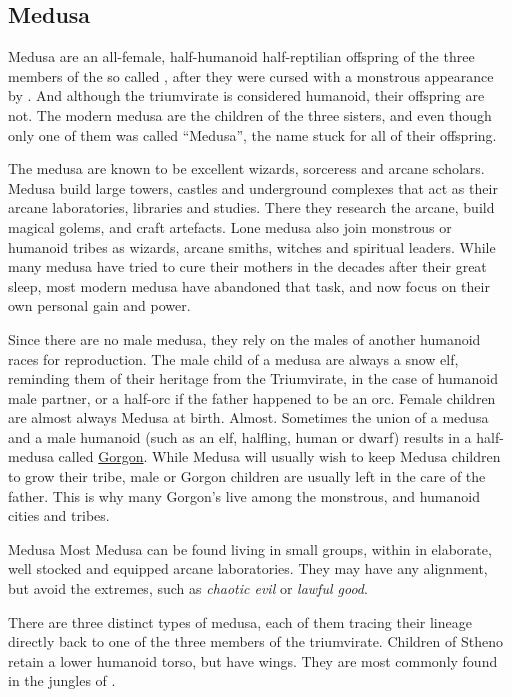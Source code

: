 \subsection{Medusa}
\label{sec:Medusa}

Medusa are an all-female, half-humanoid half-reptilian offspring of the three
members of the so called , after they were cursed
with a monstrous appearance by . And although the
triumvirate is considered humanoid, their offspring are not. The modern medusa
are the children of the three sisters, and even though only one of them was
called ``Medusa'', the name stuck for all of their offspring.

The medusa are known to be excellent wizards, sorceress and arcane
scholars. Medusa build large towers, castles and underground complexes that
act as their arcane laboratories, libraries and studies. There they research
the arcane, build magical golems, and craft artefacts. Lone medusa also join
monstrous or humanoid tribes as wizards, arcane smiths, witches and spiritual
leaders. While many medusa have tried to cure their mothers in the decades
after their great sleep, most modern medusa have abandoned that task, and now
focus on their own personal gain and power.

Since there are no male medusa, they rely on the males of another humanoid
races for reproduction. The male child of a medusa are always a snow elf,
reminding them of their heritage from the Triumvirate, in the case of humanoid
male partner, or a half-orc if the father happened to be an orc. Female children
are almost always Medusa at birth. Almost. Sometimes the union of a medusa and
a male humanoid (such as an elf, halfling, human or dwarf) results in a
half-medusa called \hyperref[sec:Gorgons]{Gorgon}. While Medusa will usually
wish to keep Medusa children to grow their tribe, male or Gorgon children are
usually left in the care of the father. This is why many Gorgon's live among
the monstrous, and humanoid cities and tribes.

\begin{35e}{Medusa}
  Most Medusa can be found living in small groups, within in elaborate, well
  stocked and equipped arcane laboratories. They may have any alignment, but
  avoid the extremes, such as \emph{chaotic evil} or \emph{lawful good}.
\end{35e}

There are three distinct types of medusa, each of them tracing their lineage
directly back to one of the three members of the triumvirate. Children of Stheno
retain a lower humanoid torso, but have wings. They are most commonly found in
the jungles of .


